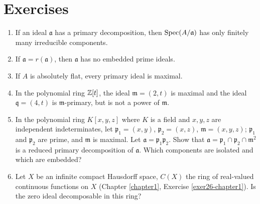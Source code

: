 \section*{Exercises}

\begin{enumerate}
    \item \label{exer1-chapter4}If an ideal $\mathfrak{a}$ has a primary decomposition, then $\operatorname{Spec}(A/\mathfrak{a})$ has only finitely many irreducible components.

    \item \label{exer2-chapter4}If $\mathfrak{a} = r(\mathfrak{a})$, then $\mathfrak{a}$ has no embedded prime ideals.

    \item \label{exer3-chapter4}If $A$ is absolutely flat, every primary ideal is maximal.

    \item \label{exer4-chapter4}In the polynomial ring $\mathbb{Z}[t]$, the ideal $\mathfrak{m} = (2, t)$ is maximal and the ideal $\mathfrak{q} = (4, t)$ is $\mathfrak{m}$-primary, but is not a power of $\mathfrak{m}$.

    \item \label{exer5-chapter4}In the polynomial ring $K[x, y, z]$ where $K$ is a field and $x, y, z$ are independent indeterminates, let $\mathfrak{p}_1 = (x, y)$, $\mathfrak{p}_2 = (x, z)$, $\mathfrak{m} = (x, y, z)$; $\mathfrak{p}_1$ and $\mathfrak{p}_2$ are prime, and $\mathfrak{m}$ is maximal. Let $\mathfrak{a} = \mathfrak{p}_1 \mathfrak{p}_2$. Show that $\mathfrak{a} = \mathfrak{p}_1 \cap \mathfrak{p}_2 \cap \mathfrak{m}^2$ is a reduced primary decomposition of $\mathfrak{a}$. Which components are isolated and which are embedded?

    \item \label{exer6-chapter4}Let $X$ be an infinite compact Hausdorff space, $C(X)$ the ring of real-valued continuous functions on $X$ (Chapter \ref{chapter1}, Exercise \ref{exer26-chapter1}). Is the zero ideal decomposable in this ring?


\end{enumerate}
